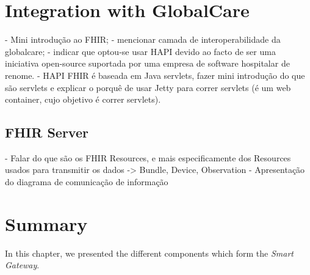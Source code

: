\section{Integration with GlobalCare}

- Mini introdução ao FHIR;
- mencionar camada de interoperabilidade da globalcare;
- indicar que optou-se usar HAPI devido ao facto de ser uma iniciativa open-source suportada por uma empresa de software hospitalar de renome.
- HAPI FHIR é baseada em Java servlets, fazer mini introdução do que são servlets e explicar o porquê de usar Jetty para correr servlets (é um web container, cujo objetivo é correr servlets). 

\subsection{FHIR Server}

- Falar do que são os FHIR Resources, e mais especificamente dos Resources usados para transmitir os dados -> Bundle, Device, Observation
- Apresentação do diagrama de comunicação de informação

\section{Summary}

In this chapter, we presented the different components which form the \textit{Smart Gateway}.